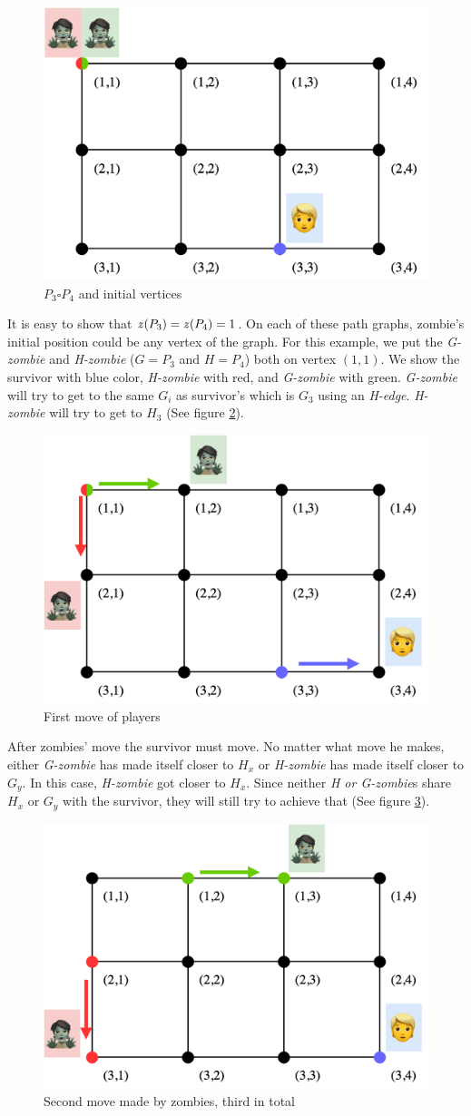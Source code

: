 \documentclass[1p]{elsarticle}
\newcommand{\zn}{\ooalign{$z$\cr\hfil\rule[.5ex]{.2em}{.08ex}\hfil\cr}}
\begin{document}
\begin{figure}[h!]
	\centering
	\includegraphics[width=0.5\linewidth]{p34m1.png}
	\caption{$P_3 \square P_4$ and initial vertices}
	\label{fig:p3}
\end{figure}

It is easy to show that $\zn(P_3) = \zn(P_4) = 1$. On each of these path graphs, zombie's initial position could be any
vertex of the graph. For this example, we put the {\it G-zombie} and {\it H-zombie} ($G = P_3$ and $H = P_4$) both on
vertex $(1,1)$. We show the survivor with blue color, {\it H-zombie} with red, and {\it G-zombie} with green. {\it
G-zombie} will try to get to the same $G_{i}$ as survivor's which is $G_3$ using an {\it H-edge}. {\it H-zombie} will
try to get to $H_3$ (See figure \ref{fig:p4}).

\begin{figure}[h!]
	\centering
	\includegraphics[width=0.5\linewidth]{p34m2.png}
	\caption{First move of players}
	\label{fig:p4}
\end{figure}

After zombies' move the survivor must move. No matter what move he makes, either {\it G-zombie} has made itself closer
to $H_x$ or {\it H-zombie} has made itself closer to $G_y$. In this case, {\it H-zombie} got closer to $H_x$. Since
neither {\it H or G-zombie}s share $H_x$ or $G_y$ with the survivor, they will still try to achieve that (See figure \ref{fig:p5}).

\begin{figure}[h!]
	\centering
	\includegraphics[width=0.5\linewidth]{p34m3.png}
	\caption{Second move made by zombies, third in total}
	\label{fig:p5}
\end{figure}
\end{document}
